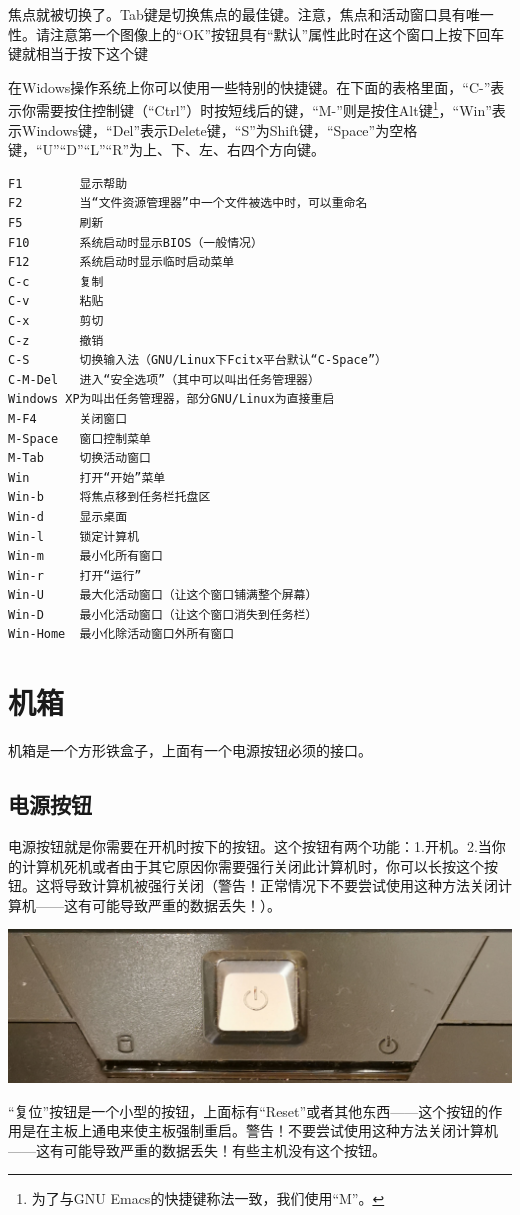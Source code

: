 焦点就被切换了。Tab键是切换焦点的最佳键。注意，焦点和活动窗口具有唯一性。请注意第一个图像上的“OK”按钮具有“默认”属性此时在这个窗口上按下回车键就相当于按下这个键\par
在Widows操作系统上你可以使用一些特别的快捷键。在下面的表格里面，“C-”表示你需要按住控制键（“Ctrl”）时按短线后的键，“M-”则是按住Alt键\footnote{为了与GNU Emacs的快捷键称法一致，我们使用“M”。}，“Win”表示Windows键，“Del”表示Delete键，“S”为Shift键，“Space”为空格键，“U”“D”“L”“R”为上、下、左、右四个方向键。
\begin{verbatim}
F1        显示帮助
F2        当“文件资源管理器”中一个文件被选中时，可以重命名
F5        刷新
F10       系统启动时显示BIOS（一般情况）
F12       系统启动时显示临时启动菜单
C-c       复制
C-v       粘贴
C-x       剪切
C-z       撤销
C-S       切换输入法（GNU/Linux下Fcitx平台默认“C-Space”）
C-M-Del   进入“安全选项”（其中可以叫出任务管理器）
Windows XP为叫出任务管理器，部分GNU/Linux为直接重启
M-F4      关闭窗口
M-Space   窗口控制菜单
M-Tab     切换活动窗口
Win       打开“开始”菜单
Win-b     将焦点移到任务栏托盘区
Win-d     显示桌面
Win-l     锁定计算机
Win-m     最小化所有窗口
Win-r     打开“运行”
Win-U     最大化活动窗口（让这个窗口铺满整个屏幕）
Win-D     最小化活动窗口（让这个窗口消失到任务栏）
Win-Home  最小化除活动窗口外所有窗口
\end{verbatim}
\section{机箱}
机箱是一个方形铁盒子，上面有一个电源按钮必须的接口。
\subsection{电源按钮}
电源按钮就是你需要在开机时按下的按钮。这个按钮有两个功能：1.开机。2.当你的计算机死机或者由于其它原因你需要强行关闭此计算机时，你可以长按这个按钮。这将导致计算机被强行关闭（{\color{red}警告！正常情况下不要尝试使用这种方法关闭计算机——这有可能导致严重的数据丢失！}）。
\begin{center}
	\includegraphics[scale=0.06]{pic/StB}
\end{center}\par
“复位”按钮是一个小型的按钮，上面标有“Reset”或者其他东西——这个按钮的作用是在主板上通电来使主板强制重启。{\color{red}警告！不要尝试使用这种方法关闭计算机——这有可能导致严重的数据丢失！}有些主机没有这个按钮。
